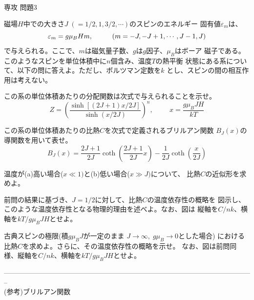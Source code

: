 \documentclass[fleqn]{jbook}
\begin{document}
\begin{question}{専攻 問題3}{}


磁場$H$中での大きさ$J\;(=1/2,1,3/2,\cdots)$のスピンのエネルギー
固有値$\varepsilon_m$は、
%
\[ \varepsilon_m = g\mu_BHm, \hspace{10mm}(m=-J,-J+1,\cdots,J-1,J) \]
%
で与えられる。ここで、$m$は磁気量子数、$g$は$g$因子、$\mu_B$はボーア
磁子である。このようなスピンを単位体積中に$n$個含み、温度$T$の熱平衡
状態にある系について、以下の問に答えよ。ただし、ボルツマン定数を$k$
とし、スピンの間の相互作用は考えない。


\begin{subquestions}
\SubQuestion
  この系の単位体積あたりの分配関数は次式で与えられることを示せ。
%
  \[ Z = \left(\frac{\sinh[(2J+1)x/2J]}{\sinh(x/2J)}\right)^n,%
     \hspace{1cm}x=\frac{g\mu_BJH}{kT} \]
%

\SubQuestion
  この系の単位体積あたりの比熱$C$を次式で定義されるブリルアン関数
  $B_J(x)$の導関数を用いて表せ。
%
  \[ B_J(x) = \frac{2J+1}{2J}\coth\left(\frac{2J+1}{2J}x\right)
             -\frac{1}{2J}\coth\left(\frac{x}{2J}\right) \]
%

\SubQuestion
  温度が(a)高い場合($x\ll 1)$と(b)低い場合($x\gg J)$について、
  比熱$C$の近似形を求めよ。


\SubQuestion
  前問の結果に基づき、$J=1/2$に対して、比熱$C$の温度依存性の概略を
  図示し、このような温度依存性となる物理的理由を述べよ。なお、図は
  縦軸を$C/nk$、横軸を$kT/g\mu_BJH$とせよ。


\SubQuestion
  古典スピンの極限(積$g\mu_BJ$が一定のまま
  $J\rightarrow \infty,\;g\mu_B\rightarrow 0$とした場合)
  における比熱$C$を求めよ。さらに、その温度依存性の概略を示せ。
  なお、図は前問同様、縦軸を$C/nk$、横軸を$kT/g\mu_BJH$とせよ。

--------------------------------------------------------------------------------------------------------------\\
(参考)ブリルアン関数
%



\end{subquestions}
\end{question}
\end{document}
